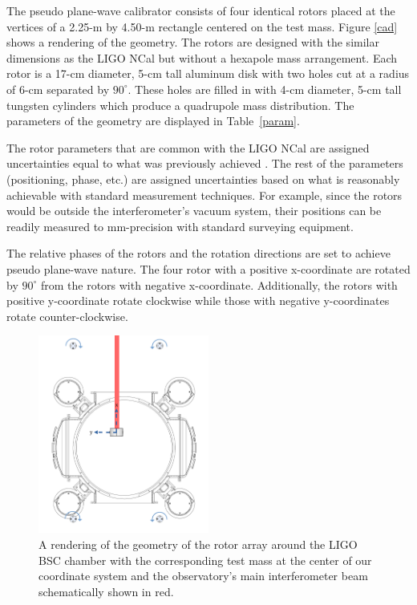 \documentclass[superscriptaddress, twocolumn, prd]{revtex4-1}
\begin{document}
The pseudo plane-wave calibrator consists of four identical rotors placed at the vertices of a 2.25-m by 4.50-m rectangle centered on the test mass. Figure \ref{cad} shows a rendering of the geometry. The rotors are designed with the similar dimensions as the LIGO NCal \cite{ncal} but without a hexapole mass arrangement. Each rotor is a 17-cm diameter, 5-cm tall aluminum disk with two holes cut at a radius of 6-cm separated by $90^\circ$. These holes are filled in with 4-cm diameter, 5-cm tall  tungsten cylinders which produce a quadrupole mass distribution. The parameters of the geometry are displayed in Table~\ref{param}.

The rotor parameters that are common with the LIGO NCal are assigned uncertainties equal to what was previously achieved \cite{ncal}. The rest of the parameters (positioning, phase, etc.) are assigned uncertainties based on what is reasonably achievable with standard measurement techniques. For example, since the rotors would be outside the interferometer's vacuum system, their positions can be readily measured to  mm-precision with standard surveying equipment. \cite{ncal}

The relative phases of the rotors and the rotation directions are set to achieve pseudo plane-wave nature. The four rotor with a positive x-coordinate are rotated by $90^\circ$ from the rotors with negative x-coordinate. Additionally, the rotors with positive y-coordinate rotate clockwise while those with negative y-coordinates rotate counter-clockwise. 

\begin{figure}[!h]
\centering \includegraphics[width=0.5\textwidth]{Super4BSCTopDownAxesSpinNew.pdf}
\caption{A rendering of the geometry of the rotor array around the LIGO BSC chamber with the corresponding test mass at the center of our coordinate system and the observatory's main interferometer beam schematically shown in red.}
\label{bsc} 
\end{figure}
\end{document}
